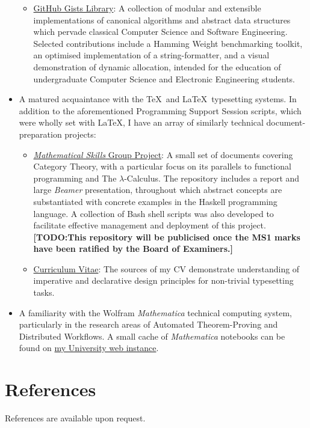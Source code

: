 \documentclass{article}
\makeatletter
\newcommand{\todomark}[1]{{\color{red}\textbf{[TODO:\@ #1]}}}
\newcommand{\githublink}[2]{\href{https://github.com/oliverdixon/#1}{#2}}
\newcommand{\gistlink}[2]{\href{https://gist.github.com/oliverdixon/#1}{#2}}
\newcommand{\weblink}[2]{\href{https://www-users.york.ac.uk/~od641/#1}{#2}}
\makeatother
\begin{document}
\begin{itemize}
\begin{itemize}
                \item \gistlink{}{GitHub Gists Library}: A collection of modular
                and extensible implementations of canonical algorithms and
                abstract data structures which pervade classical Computer
                Science and Software Engineering. Selected contributions include
                a Hamming Weight benchmarking toolkit, an optimised
                implementation of a string-formatter, and a visual demonstration
                of dynamic allocation, intended for the education of
                undergraduate Computer Science and Electronic Engineering
                students.
        \end{itemize}
        \item A matured acquaintance with the \TeX\ and \LaTeX\ typesetting
        systems. In addition to the aforementioned Programming Support Session
        scripts, which were wholly set with \LaTeX, I have an array of similarly
        technical document-preparation projects:
        \begin{itemize}
                \item \githublink{MS1GP}{\textit{Mathematical Skills} Group
                Project}: A small set of documents covering Category Theory,
                with a particular focus on its parallels to functional
                programming and The $\lambda$-Calculus. The repository
                includes a report and large \textit{Beamer} presentation,
                throughout which abstract concepts are substantiated with
                concrete examples in the Haskell programming language. A
                collection of Bash shell scripts was also developed to
                facilitate effective management and deployment of this project.
                \todomark{This repository will be publicised once the MS1 marks
                have been ratified by the Board of Examiners.}

                \item \githublink{cv}{Curriculum Vitae}: The sources of my CV
                demonstrate understanding of imperative and declarative design
                principles for non-trivial typesetting tasks.
        \end{itemize}
        \item A familiarity with the Wolfram \textit{Mathematica} technical
        computing system, particularly in the research areas of Automated
        Theorem-Proving and Distributed Workflows. A small cache of
        \textit{Mathematica} notebooks can be found on
        \weblink{misc\_mma}{my University web instance}.
\end{itemize}
%
%
\section{References}
References are available upon request.
%
\end{document}

